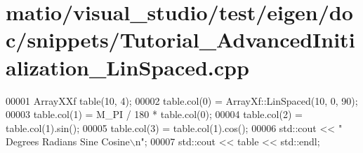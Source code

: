 \hypertarget{matio_2visual__studio_2test_2eigen_2doc_2snippets_2_tutorial___advanced_initialization___lin_spaced_8cpp_source}{}\section{matio/visual\+\_\+studio/test/eigen/doc/snippets/\+Tutorial\+\_\+\+Advanced\+Initialization\+\_\+\+Lin\+Spaced.cpp}
\label{matio_2visual__studio_2test_2eigen_2doc_2snippets_2_tutorial___advanced_initialization___lin_spaced_8cpp_source}

\begin{DoxyCode}
00001 ArrayXXf table(10, 4);
00002 table.col(0) = ArrayXf::LinSpaced(10, 0, 90);
00003 table.col(1) = M\_PI / 180 * table.col(0);
00004 table.col(2) = table.col(1).sin();
00005 table.col(3) = table.col(1).cos();
00006 std::cout << \textcolor{stringliteral}{"  Degrees   Radians      Sine    Cosine\(\backslash\)n"};
00007 std::cout << table << std::endl;
\end{DoxyCode}
